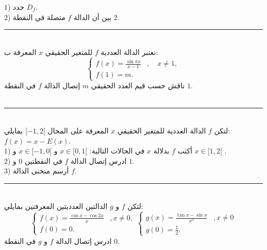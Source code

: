 \documentclass[10pt,a4paper,twocolumn]{arabart}
\begin{document}
$1$) حدد $D_f$.\\
$2$) بين أن الدالة $f$ متصلة في النقطة $2$.
\\
 \hrule
 \\
        نعتبر الدالة العددية $f$ للمتغير الحقيقي $x$ المعرفة ب:\\
    \begin{displaymath}
 \left\{
    \begin{array}{ll}
       f(x)=\displaystyle\frac{\sin{\pi x}}{x-1}    &, \quad x \neq 1,\\
      f(1)=m.   &
    \end{array}
\right.
\end{displaymath}
ناقش حسب قيم العدد الحقيقي $m$ إتصال  الدالة $f$  في النقطة $1$.
\\
\\
 \hrule
 \\
       لتكن $f$ الدالة العددية  للمتغير الحقيقي $x$ المعرفة على المجال
       $[-1,2[$
       بمايلي: $f(x)=x-E(x)$.
       \\
$1$) أكتب $f$ بدلالة $x$ في الحالات التالية:
$x\in [0,1[$
و
$x\in [-1,0[$
و
$x\in [1,2[$
.\\
$2$) ادرس إتصال الدالة $f$  في النقطتين $0$ و $1$.\\
$3$) أرسم منحنى الدالة $f$.
\\
 \hrule
 \\
       لتكن $f$ و $g$ الدالتين العدديتين   المعرفتين 
       بمايلي:
       \\\begin{displaymath}
 \left\{
    \begin{array}{ll}
       f(x)=\displaystyle\frac{\cos{ x} - \cos{2x}}{x}    &,  x \neq 0,\\
      f(0)=0.   &
    \end{array}
\right.
\left\{
    \begin{array}{ll}
       g(x)=\displaystyle\frac{\tan{ x} - \sin{x}}{x^3}    &,  x \neq 0\\
      g(0)=\displaystyle\frac{1}{2}.   &
    \end{array}
\right.
\end{displaymath}
ادرس إتصال الدالة $f$ و  $g$ في النقطة $0$.
\end{document}
